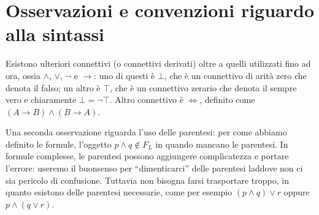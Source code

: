 \section{Osservazioni e convenzioni riguardo alla sintassi}
Esistono ulteriori connettivi (o connettivi derivati) oltre a quelli utilizzati fino ad ora, 
ossia $\land$, $\lor$, $\neg$ e $\rightarrow$: 
uno di questi è $\bot$, che è un connettivo di arità zero che denota il falso; un 
altro è $\top$, che è un connettivo zerario che denota il
sempre vero e chiaramente $\bot = \neg \top$. Altro connettivo è $\iff$, 
definito come $(A \rightarrow B) \land (B \rightarrow A)$.

Una seconda osservazione riguarda l'uso delle parentesi: per come abbiamo definito 
le formule, l'oggetto $p \land q \notin F_L$ in quando mancano le parentesi. 
In formule complesse, le parentesi possono aggiungere complicatezza e portare l'errore: 
useremo il buonsenso per ``dimenticarci'' delle parentesi laddove non ci sia 
pericolo di confusione. Tuttavia non bisogna farsi trasportare troppo, in quanto 
esistono delle parentesi necessarie, come per esempio $(p \land q ) \lor r$ 
oppure $p \land (q \lor r)$. 


